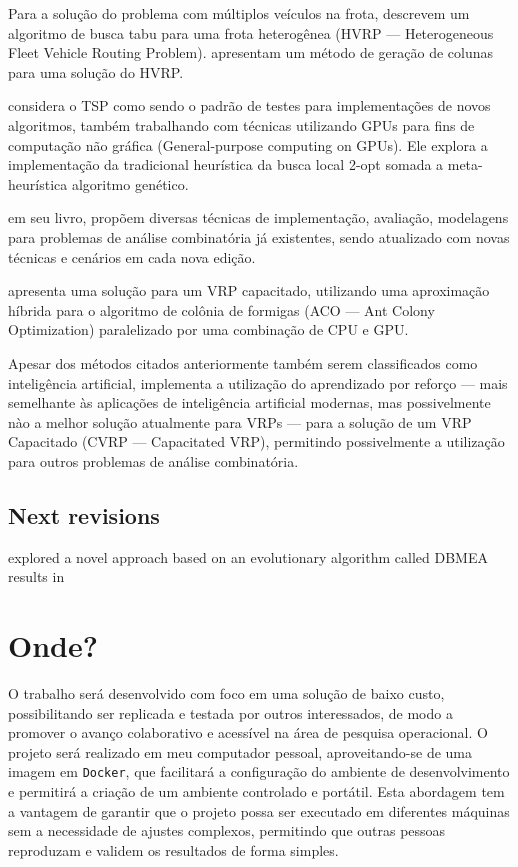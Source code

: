\documentclass[
    openany,
    12pt,
    a4paper,
    twoside,
    english,
    brazil, sumario=tradicional
]{/home/lucas_galdino/Desktop/TCC/planning/abntex2/abntex2}
\begin{document}
Para a solução do problema com múltiplos veículos na frota,  descrevem um algoritmo de busca tabu para uma frota heterogênea (HVRP — Heterogeneous Fleet Vehicle Routing Problem)\@.  apresentam um método de geração de colunas para uma solução do HVRP\@. 

 considera o TSP como sendo o padrão de testes para implementações de novos algoritmos, também trabalhando com técnicas utilizando GPUs para fins de computação não gráfica (General-purpose computing on GPUs). Ele explora a implementação da tradicional heurística da busca local 2-opt somada a meta-heurística algoritmo genético.

 em seu livro, propõem diversas técnicas de implementação, avaliação, modelagens para problemas de análise combinatória já existentes, sendo atualizado com novas técnicas e cenários em cada nova edição.

 apresenta uma solução para um VRP capacitado, utilizando uma aproximação híbrida para o algoritmo de colônia de formigas (ACO — Ant Colony Optimization) paralelizado por uma combinação de CPU e GPU\@.

Apesar dos métodos citados anteriormente também serem classificados como inteligência artificial,  implementa a utilização do aprendizado por reforço — mais semelhante às aplicações de inteligência artificial modernas, mas possivelmente nào a melhor solução atualmente para VRPs — para a solução de um VRP Capacitado (CVRP — Capacitated VRP), permitindo possivelmente a utilização para outros problemas de análise combinatória.

\section{Next revisions}

 explored a novel approach based on an evolutionary algorithm called DBMEA results in 

\chapter{Onde?}

O trabalho será desenvolvido com foco em uma solução de baixo custo, possibilitando ser replicada e testada por outros interessados, de modo a promover o avanço colaborativo e acessível na área de pesquisa operacional. O projeto será realizado em meu computador pessoal, aproveitando-se de uma imagem em \verb|Docker|, que facilitará a configuração do ambiente de desenvolvimento e permitirá a criação de um ambiente controlado e portátil. Esta abordagem tem a vantagem de garantir que o projeto possa ser executado em diferentes máquinas sem a necessidade de ajustes complexos, permitindo que outras pessoas reproduzam e validem os resultados de forma simples.
\end{document}

